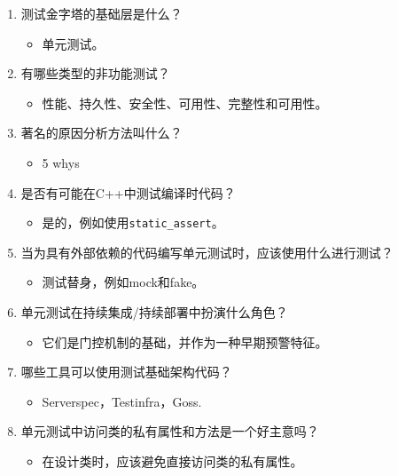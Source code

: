 \begin{enumerate}
\item
测试金字塔的基础层是什么？
\begin{itemize}
\item 
单元测试。
\end{itemize}

\item
有哪些类型的非功能测试？
\begin{itemize}
\item 
性能、持久性、安全性、可用性、完整性和可用性。
\end{itemize}

\item
著名的原因分析方法叫什么？
\begin{itemize}
\item 
5 whys
\end{itemize}

\item
是否有可能在C++中测试编译时代码？
\begin{itemize}
\item 
是的，例如使用\texttt{static\_assert}。
\end{itemize}

\item
当为具有外部依赖的代码编写单元测试时，应该使用什么进行测试？
\begin{itemize}
\item 
测试替身，例如mock和fake。
\end{itemize}

\item
单元测试在持续集成/持续部署中扮演什么角色？
\begin{itemize}
\item 
它们是门控机制的基础，并作为一种早期预警特征。
\end{itemize}

\item
哪些工具可以使用测试基础架构代码？
\begin{itemize}
\item 
Serverspec，Testinfra，Goss.
\end{itemize}

\item
单元测试中访问类的私有属性和方法是一个好主意吗？
\begin{itemize}
\item 
在设计类时，应该避免直接访问类的私有属性。
\end{itemize}
\end{enumerate}
